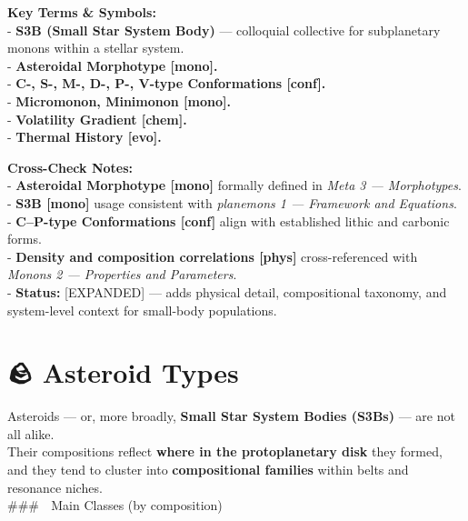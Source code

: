 \documentclass[
  letterpaper,
]{book}
\begin{document}
\textbf{Key Terms \& Symbols:}\\
- \textbf{S3B (Small Star System Body)} --- colloquial collective for
subplanetary monons within a stellar system.\\
- \textbf{Asteroidal Morphotype {[}mono{]}.}\\
- \textbf{C-, S-, M-, D-, P-, V-type Conformations {[}conf{]}.}\\
- \textbf{Micromonon, Minimonon {[}mono{]}.}\\
- \textbf{Volatility Gradient {[}chem{]}.}\\
- \textbf{Thermal History {[}evo{]}.}

\textbf{Cross-Check Notes:}\\
- \textbf{Asteroidal Morphotype {[}mono{]}} formally defined in
\emph{Meta 3 --- Morphotypes}.\\
- \textbf{S3B {[}mono{]}} usage consistent with \emph{planemons 1 ---
Framework and Equations}.\\
- \textbf{C--P-type Conformations {[}conf{]}} align with established
lithic and carbonic forms.\\
- \textbf{Density and composition correlations {[}phys{]}}
cross-referenced with \emph{Monons 2 --- Properties and Parameters}.\\
- \textbf{Status:} {[}EXPANDED{]} --- adds physical detail,
compositional taxonomy, and system-level context for small-body
populations.

\section{🪨 Asteroid Types}\label{asteroid-types}

Asteroids --- or, more broadly, \textbf{Small Star System Bodies (S3Bs)}
--- are not all alike.\\
Their compositions reflect \textbf{where in the protoplanetary disk}
they formed, and they tend to cluster into \textbf{compositional
families} within belts and resonance niches.\\
\#\#\# 🔹 Main Classes (by composition)
\end{document}
